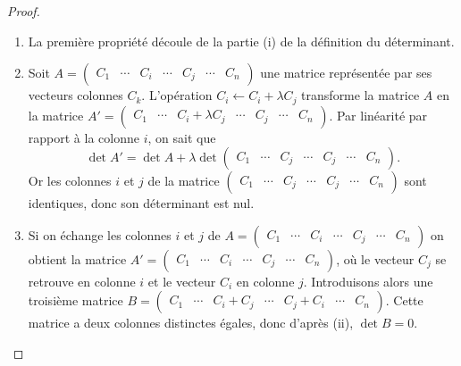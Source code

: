 \documentclass[class=report,crop=false]{standalone}
\begin{document}
\begin{proof}
~
\begin{enumerate}
  \item La première propriété découle de la partie (i) de la définition du déterminant.

  \item Soit $A=\begin{pmatrix}
C_1&\cdots&C_i&\cdots&C_j&\cdots&C_n
\end{pmatrix}$ une matrice représentée par ses vecteurs colonnes $C_k$.
L'opération $C_i \leftarrow C_i+\lambda C_j$ transforme la matrice $A$ en la matrice
$A'=\begin{pmatrix}
C_1&\cdots&\displaystyle C_i+\lambda C_j&\cdots&C_j&\cdots&C_n\end{pmatrix}$.
Par linéarité par rapport à la colonne $i$, on sait que
$$\det A'=\det A+\lambda \det \begin{pmatrix} C_1&\cdots&C_j&\cdots&C_j&\cdots&C_n
\end{pmatrix}.$$
Or les colonnes $i$ et $j$ de la matrice
$\begin{pmatrix} C_1&\cdots&C_j&\cdots&C_j&\cdots&C_n\end{pmatrix}$
sont identiques, donc son déterminant est nul.


  \item Si on échange les colonnes $i$ et $j$ de $A=\begin{pmatrix}
C_1&\cdots&C_i&\cdots&C_j&\cdots&C_n\end{pmatrix}$ on obtient la matrice
$A'=\begin{pmatrix}
C_1&\cdots&C_i&\cdots&C_j&\cdots&C_n\end{pmatrix}$,
où le vecteur $C_j$ se retrouve en colonne $i$ et le vecteur $C_i$ en colonne $j$.
Introduisons alors une troisième matrice
$B=\begin{pmatrix}C_1&\cdots&C_i+C_j&\cdots&C_j+C_i&\cdots&C_n\end{pmatrix}$.
Cette matrice a deux colonnes distinctes égales, donc d'après (ii), $\det B=0$.


\end{enumerate}
\end{proof}
\end{document}

